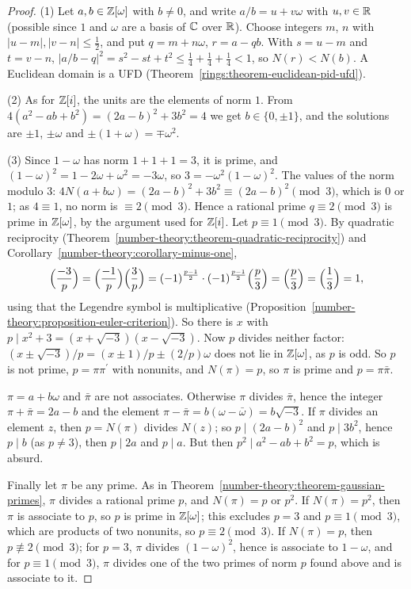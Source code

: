 \begin{proof}
(1) Let $a, b \in \mathbb{Z}[\omega]$ with $b \neq 0$, and write $a/b = u + v\omega$ with $u, v \in \mathbb{R}$ (possible since $1$ and $\omega$ are a basis of $\mathbb{C}$ over $\mathbb{R}$). Choose integers $m$, $n$ with
$|u - m|, |v - n| \leq \frac12$, and put $q = m + n\omega$, $r = a - qb$. With $s = u - m$ and $t = v - n$, $|a/b - q|^2 = s^2 - st + t^2 \leq \frac14 + \frac14 + \frac14 < 1$, so $N(r) < N(b)$. A Euclidean
domain is a UFD (Theorem~\ref{rings:theorem-euclidean-pid-ufd}).

(2) As for $\mathbb{Z}[i]$, the units are the elements of norm $1$. From $4(a^2 - ab + b^2) = (2a - b)^2 + 3b^2 = 4$ we get $b \in \{0, \pm1\}$, and the solutions are $\pm1$, $\pm\omega$ and $\pm(1 + \omega) = \mp\omega^2$.

(3) Since $1 - \omega$ has norm $1 + 1 + 1 = 3$, it is prime, and $(1 - \omega)^2 = 1 - 2\omega + \omega^2 = -3\omega$, so $3 = -\omega^2(1 - \omega)^2$. The values of the norm modulo $3$:
$4N(a + b\omega) = (2a - b)^2 + 3b^2 \equiv (2a - b)^2 \pmod 3$, which is $0$ or $1$; as $4 \equiv 1$, no norm is $\equiv 2 \pmod 3$. Hence a rational prime $q \equiv 2 \pmod 3$ is prime in $\mathbb{Z}[\omega]$, by the
argument used for $\mathbb{Z}[i]$. Let $p \equiv 1 \pmod 3$. By quadratic reciprocity (Theorem~\ref{number-theory:theorem-quadratic-reciprocity}) and Corollary~\ref{number-theory:corollary-minus-one},
\[
\Bigl(\frac{-3}{p}\Bigr) = \Bigl(\frac{-1}{p}\Bigr)\Bigl(\frac{3}{p}\Bigr) = (-1)^{\frac{p-1}{2}}\cdot(-1)^{\frac{p-1}{2}}\Bigl(\frac{p}{3}\Bigr) = \Bigl(\frac{p}{3}\Bigr) = \Bigl(\frac{1}{3}\Bigr) = 1,
\]
using that the Legendre symbol is multiplicative (Proposition~\ref{number-theory:proposition-euler-criterion}). So there is $x$ with $p \mid x^2 + 3 = (x + \sqrt{-3})(x - \sqrt{-3})$. Now $p$ divides
neither factor: $(x \pm \sqrt{-3})/p = (x \pm 1)/p \pm (2/p)\omega$ does not lie in $\mathbb{Z}[\omega]$, as $p$ is odd. So $p$ is not prime, $p = \pi\pi^{\prime}$ with nonunits, and $N(\pi) = p$, so $\pi$ is prime
and $p = \pi\bar\pi$.

$\pi = a + b\omega$ and $\bar\pi$ are not associates. Otherwise $\pi$ divides $\bar\pi$, hence the integer $\pi + \bar\pi = 2a - b$ and the element $\pi - \bar\pi = b(\omega - \bar\omega) = b\sqrt{-3}$. If $\pi$
divides an element $z$, then $p = N(\pi)$ divides $N(z)$; so $p \mid (2a - b)^2$ and $p \mid 3b^2$, hence $p \mid b$ (as $p \neq 3$), then $p \mid 2a$ and $p \mid a$. But then $p^2 \mid a^2 - ab + b^2 = p$,
which is absurd.

Finally let $\pi$ be any prime. As in Theorem~\ref{number-theory:theorem-gaussian-primes}, $\pi$ divides a rational prime $p$, and $N(\pi) = p$ or $p^2$. If $N(\pi) = p^2$, then $\pi$ is associate to $p$, so $p$
is prime in $\mathbb{Z}[\omega]$; this excludes $p = 3$ and $p \equiv 1 \pmod 3$, which are products of two nonunits, so $p \equiv 2 \pmod 3$. If $N(\pi) = p$, then $p \not\equiv 2 \pmod 3$; for $p = 3$, $\pi$
divides $(1 - \omega)^2$, hence is associate to $1 - \omega$, and for $p \equiv 1 \pmod 3$, $\pi$ divides one of the two primes of norm $p$ found above and is associate to it.
\end{proof}

